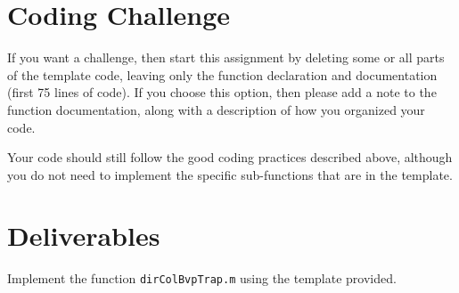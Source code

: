 \section*{Coding Challenge}

If you want a challenge, then start this assignment by deleting some or all
parts of the template code, leaving only the function declaration and
documentation (first 75 lines of code). If you choose this option, then please
add a note to the function documentation, along with a description of how you
organized your code.

Your code should still follow the good coding practices described above,
although you do not need to implement the specific sub-functions that are
in the template.

\section*{Deliverables}

Implement the function \texttt{dirColBvpTrap.m} using the template provided.


